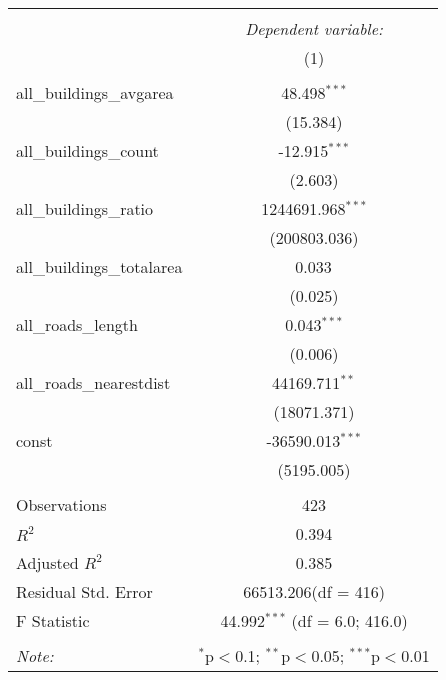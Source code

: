 \begin{table}[!htbp] \centering
\begin{tabular}{@{\extracolsep{5pt}}lc}
\\[-1.8ex]\hline
\hline \\[-1.8ex]
& \multicolumn{1}{c}{\textit{Dependent variable:}} \
\cr \cline{1-2}
\\[-1.8ex] & (1) \\
\hline \\[-1.8ex]
 all_buildings_avgarea & 48.498$^{***}$ \\
  & (15.384) \\
 all_buildings_count & -12.915$^{***}$ \\
  & (2.603) \\
 all_buildings_ratio & 1244691.968$^{***}$ \\
  & (200803.036) \\
 all_buildings_totalarea & 0.033$^{}$ \\
  & (0.025) \\
 all_roads_length & 0.043$^{***}$ \\
  & (0.006) \\
 all_roads_nearestdist & 44169.711$^{**}$ \\
  & (18071.371) \\
 const & -36590.013$^{***}$ \\
  & (5195.005) \\
\hline \\[-1.8ex]
 Observations & 423 \\
 $R^2$ & 0.394 \\
 Adjusted $R^2$ & 0.385 \\
 Residual Std. Error & 66513.206(df = 416)  \\
 F Statistic & 44.992$^{***}$ (df = 6.0; 416.0) \\
\hline
\hline \\[-1.8ex]
\textit{Note:} & \multicolumn{1}{r}{$^{*}$p$<$0.1; $^{**}$p$<$0.05; $^{***}$p$<$0.01} \\
\end{tabular}
\end{table}